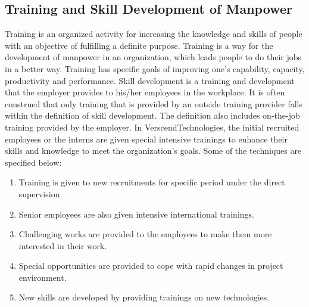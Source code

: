 \subsection{Training and Skill Development of Manpower}
Training is an organized activity for increasing the knowledge and skills of people with an objective of
fulfilling a definite purpose. Training is a way for the development of manpower in an organization, which
leads people to do their jobs in a better way. Training has specific goals of improving one's capability,
capacity, productivity and performance.
Skill development is a training and development that the employer provides to his/her employees in the
workplace. It is often construed that only training that is provided by an outside training provider falls within
the definition of skill development. The definition also includes on-the-job training provided by the employer.
In VerscendTechnologies, the initial recruited employees or the interns are given special intensive
trainings to enhance their skills and knowledge to meet the organization’s goals.
Some of the techniques are specified below:
\begin{enumerate}
\item Training is given to new recruitments for specific period under the direct supervision.
\item Senior employees are also given intensive international trainings.
\item Challenging works are provided to the employees to make them more interested in their work.
\item Special opportunities are provided to cope with rapid changes in project environment.
\item New skills are developed by providing trainings on new technologies.
\end{enumerate}
